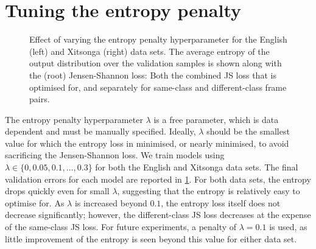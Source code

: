 \section{Tuning the entropy penalty}
\begin{figure}
  \centering

\caption{\label{fig:entropy-penalty} Effect of varying the entropy penalty hyperparameter for the English (left) and Xitsonga (right) data sets.
The average entropy of the output distribution over the validation samples is shown along with the (root) Jensen-Shannon loss: Both the combined JS loss that is optimised for, and separately for same-class and different-class frame pairs.}
\end{figure}

The entropy penalty hyperparameter $\lambda$ is a free parameter, which is data dependent and must be manually specified.
Ideally, $\lambda$ should be the smallest value for which the entropy loss in minimised, or nearly minimised, to avoid sacrificing the Jensen-Shannon loss.
We train models using $\lambda \in \{0, 0.05, 0.1, \dots, 0.3\}$ for both the English and Xitsonga data sets.
The final validation errors for each model are reported in \cref{fig:entropy-penalty}.
For both data sets, the entropy drops quickly even for small $\lambda$, suggesting that the entropy is relatively easy to optimise for.
As $\lambda$ is increased beyond $0.1$, the entropy loss itself does not decrease significantly; however, the different-class JS loss decreases at the expense of the same-class JS loss. 
For future experiments, a penalty of $\lambda = 0.1$ is used, as little improvement of the entropy is seen beyond this value for either data set.

